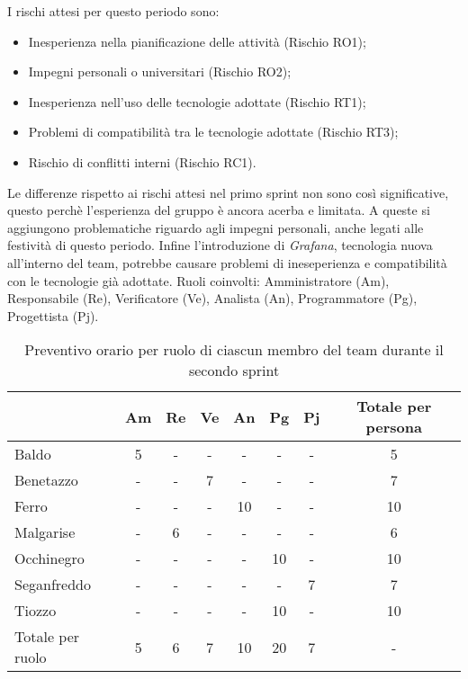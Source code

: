    I rischi attesi per questo periodo sono:
    \begin{itemize}
        \item Inesperienza nella pianificazione delle attività (Rischio RO1);
        \item Impegni personali o universitari (Rischio RO2);
        \item Inesperienza nell'uso delle tecnologie adottate (Rischio RT1);
        \item Problemi di compatibilità tra le tecnologie adottate (Rischio RT3);
        \item Rischio di conflitti interni (Rischio RC1).
    \end{itemize}
    Le differenze rispetto ai rischi attesi nel primo sprint non sono così significative, questo perchè l'esperienza del gruppo è ancora acerba e limitata.
    A queste si aggiungono problematiche riguardo agli impegni personali, anche legati alle festività di questo periodo. Infine l'introduzione di \textit{Grafana},
    tecnologia nuova all'interno del team, potrebbe causare problemi di ineseperienza e compatibilità con le tecnologie già adottate.
    \newpage
    Ruoli coinvolti: Amministratore (Am), Responsabile (Re), Verificatore (Ve), Analista (An),
    Programmatore (Pg), Progettista (Pj).
    \begin{table}[!h]
        \centering
        \begin{tabular}{ |l| c | c | c | c | c | c | c |} 
            \hline
            \textbf{} & \textbf{Am} & \textbf{Re} & \textbf{Ve} &\textbf{An} & \textbf{Pg} & \textbf{Pj} & \textbf{Totale per persona} \\
            \hline 
            Baldo       & 5 & - & - & - & - & - & 5   \\ 
            Benetazzo   & - & - & 7 & - & - & - & 7   \\ 
            Ferro       & - & - & - & 10 & - & - & 10   \\ 
            Malgarise   & - & 6 & - & - & - & - & 6   \\ 
            Occhinegro  & - & - & - & - & 10 & - & 10   \\ 
            Seganfreddo & - & - & - & - & - & 7 & 7   \\
            Tiozzo      & - & - & - & - & 10 & - & 10   \\ 
            \hline
            Totale per ruolo & 5 & 6 & 7 & 10 & 20 & 7 & - \\
            \hline
        \end{tabular}
        \caption{Preventivo orario per ruolo di ciascun membro del team durante il secondo sprint}
        \label{tab:5}
    \end{table}
